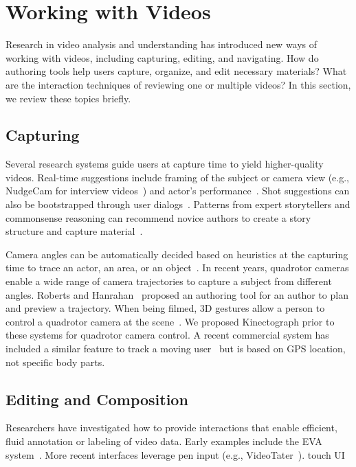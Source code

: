 
\section{Working with Videos}
\label{related_videos}

Research in video analysis and understanding has introduced new ways of working with videos, including capturing, editing, and navigating. How do authoring tools help users capture, organize, and edit necessary materials? What are the interaction techniques of reviewing one or multiple videos? In this section, we review these topics briefly.


\subsection{Capturing}
Several research systems guide users at capture time to yield higher-quality videos. Real-time suggestions include framing of the subject or camera view (e.g., NudgeCam for interview videos~\cite{Carter:2010}) and actor's performance~\cite{Heer:2004ba,Davis:2003cu}. Shot suggestions can also be bootstrapped through user dialogs~\cite{Adams:2005}.
%
Patterns from expert storytellers and commonsense reasoning can recommend novice authors to create a story structure and capture material~\cite{Barry:2003:MCC:957013.957152,Kim:2015:MSN:2702123.2702507}.

Camera angles can be automatically decided based on heuristics at the capturing time to trace an actor, an area, or an object~\cite{Ranjan:2008,Okumura:2011tr}.
%
In recent years, quadrotor cameras enable a wide range of camera trajectories to capture a subject from different angles. Roberts and Hanrahan~\cite{Roberts:2016:GDF:2897824.2925980} proposed an authoring tool for an author to plan and preview a trajectory. When being filmed, 3D gestures allow a person to control a quadrotor camera at the scene~\cite{Cauchard:2015:DME:2750858.2805823,Pfeil:2013:EGM:2449396.2449429}.
%
We proposed Kinectograph prior to these systems for quadrotor camera control. A recent commercial system has included a similar feature to track a moving user~\cite{HexoDrone} but is based on GPS location, not specific body parts.


\subsection{Editing and Composition}
Researchers have investigated how to provide interactions that enable efficient, fluid annotation or labeling of video data. Early examples include the EVA system~\cite{Mackay:1989}. More recent interfaces leverage pen input (e.g., VideoTater~\cite{Diakopoulos:2006vt}). touch UI~\cite{Sarkar:2016:SCC:2858036.2858199}

